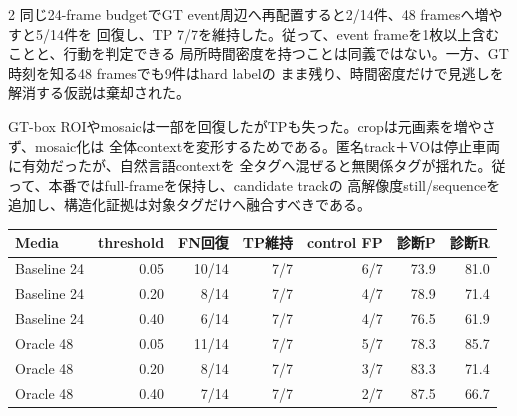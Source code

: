\documentclass[9pt,a4paper]{extarticle}
\begin{document}
\begin{multicols}{2}
同じ24-frame budgetでGT event周辺へ再配置すると2/14件、48 framesへ増やすと5/14件を
回復し、TP 7/7を維持した。従って、event frameを1枚以上含むことと、行動を判定できる
局所時間密度を持つことは同義ではない。一方、GT時刻を知る48 framesでも9件はhard labelの
まま残り、時間密度だけで見逃しを解消する仮説は棄却された。

GT-box ROIやmosaicは一部を回復したがTPも失った。cropは元画素を増やさず、mosaic化は
全体contextを変形するためである。匿名track＋VOは停止車両に有効だったが、自然言語contextを
全タグへ混ぜると無関係タグが揺れた。従って、本番ではfull-frameを保持し、candidate trackの
高解像度still/sequenceを追加し、構造化証拠は対象タグだけへ融合すべきである。

\end{multicols}
\begin{center}
\label{tab:recall-confidence}
\scriptsize
\begin{tabular}{lrrrrrr}
\toprule
Media & threshold & FN回復 & TP維持 & control FP & 診断P & 診断R\\
\midrule
Baseline 24 & 0.05 & 10/14 & 7/7 & 6/7 & 73.9 & 81.0 \\
Baseline 24 & 0.20 & 8/14 & 7/7 & 4/7 & 78.9 & 71.4 \\
Baseline 24 & 0.40 & 6/14 & 7/7 & 4/7 & 76.5 & 61.9 \\
Oracle 48 & 0.05 & 11/14 & 7/7 & 5/7 & 78.3 & 85.7 \\
Oracle 48 & 0.20 & 8/14 & 7/7 & 3/7 & 83.3 & 71.4 \\
Oracle 48 & 0.40 & 7/14 & 7/7 & 2/7 & 87.5 & 66.7 \\
\bottomrule
\end{tabular}
\end{center}
\end{document}
